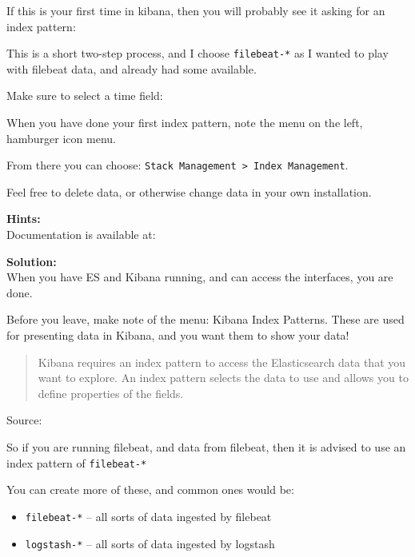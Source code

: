 \documentclass[a4paper,11pt,notitlepage]{report}
\begin{document}
If this is your first time in kibana, then you will probably see it asking for an index pattern:

This is a short two-step process, and I choose \verb+filebeat-*+ as I wanted to play with filebeat data, and already had some available.


Make sure to select a time field:


When you have done your first index pattern, note the menu on the left, hamburger icon menu.

From there you can choose: \verb+Stack Management > Index Management+.


Feel free to delete data, or otherwise change data in your own installation.



{\bf Hints:}\\
Documentation is available at:\\

{\bf Solution:}\\
When you have ES and Kibana running, and can access the interfaces, you are done.

Before you leave, make note of the menu: Kibana Index Patterns. These are used for presenting data in Kibana, and you want them to show your data!

\begin{quote}
Kibana requires an index pattern to access the Elasticsearch data that you want to explore. An index pattern selects the data to use and allows you to define properties of the fields.
\end{quote}
Source: 

So if you are running filebeat, and data from filebeat, then it is advised to use an index pattern of \verb+filebeat-*+


You can create more of these, and common ones would be:
\begin{itemize}
\item \verb+filebeat-*+ -- all sorts of data ingested by filebeat
\item \verb+logstash-*+ -- all sorts of data ingested by logstash

\end{itemize}
\end{document}
